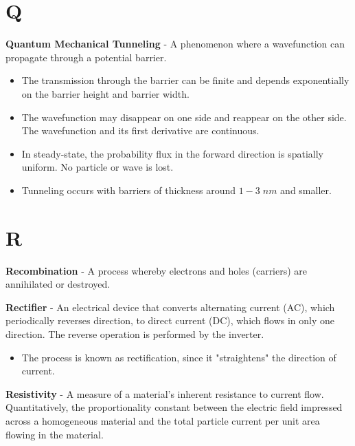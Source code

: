 \section{Q}
    \textbf{Quantum Mechanical Tunneling} - A phenomenon where a wavefunction can propagate through a potential barrier.
    \vspace{0.15cm}
    \begin{itemize}
        \setlength\itemsep{0.5em}
        \item{The transmission through the barrier can be finite and depends exponentially on the barrier height and barrier width.}
        \item{The wavefunction may disappear on one side and reappear on the other side. The wavefunction and its first derivative are continuous.}
        \item{In steady-state, the probability flux in the forward direction is spatially uniform. No particle or wave is lost.}
        \item{Tunneling occurs with barriers of thickness around $1-3\;nm$ and smaller.}
    \end{itemize}
\vspace{0.5cm}
\section{R}
    \textbf{Recombination} - A process whereby electrons and holes (carriers) are annihilated or destroyed.

\vspace{0.5cm}
\noindent
    \textbf{Rectifier} - An electrical device that converts alternating current (AC), which periodically reverses direction, to direct current (DC), which flows in only one direction. The reverse operation is performed by the inverter.
    \vspace{0.15cm}
    \begin{itemize}
        \setlength\itemsep{0.5em}
        \item{The process is known as rectification, since it "straightens" the direction of current.}
    \end{itemize}
\vspace{0.5cm}
    \textbf{Resistivity} - A measure of a material's inherent resistance to current flow.  Quantitatively, the proportionality constant between the electric field impressed across a homogeneous material and the total particle current per unit area flowing in the material.


